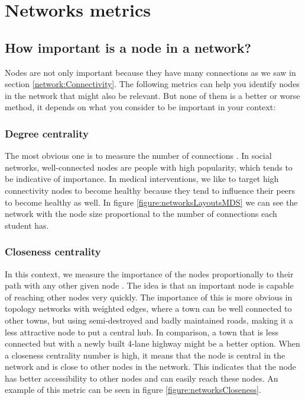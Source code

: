 \clearpage

\section{Networks metrics}

\subsection{How important is a node in a network?}


Nodes are not only important because they have many connections as we saw in section \ref{network:Connectivity}. The following metrics can help you identify nodes in the network that might also be relevant. But none of them is a better or worse method, it depends on what you consider to be important in your context:

\subsubsection{Degree centrality}

The most obvious one is to measure the number of connections \cite{Freeman1978}. In social networks, well-connected nodes are people with high popularity, which tends to be indicative of importance. In medical interventions, we like to target high connectivity nodes to become healthy because they tend to influence their peers to become healthy as well. In figure \ref{figure:networksLayoutsMDS} we can see the network with the node size proportional to the number of connections each student has.

\subsubsection{Closeness centrality}

In this context, we measure the importance of the nodes proportionally to their path with any other given node \cite{Freeman1978}. The idea is that an important node is capable of reaching other nodes very quickly. The importance of this is more obvious in topology networks with weighted edges, where a town can be well connected to other towns, but using semi-destroyed and badly maintained roads, making it a less attractive node to put a central hub. In comparison, a town that is less connected but with a newly built 4-lane highway might be a better option. When a closeness centrality number is high, it means that the node is central in the network and is close to other nodes in the network. This indicates that the node has better accessibility to other nodes and can easily reach these nodes. An example of this metric can be seen in figure \ref{figure:networksCloseness}.

